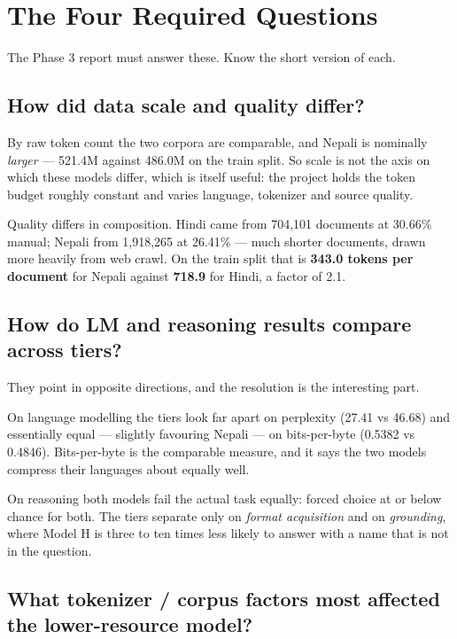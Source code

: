 \documentclass[11pt]{report}
\begin{document}
\chapter{The Four Required Questions}

The Phase 3 report must answer these. Know the short version of each.

\section{How did data scale and quality differ?}

By raw token count the two corpora are comparable, and Nepali is nominally
\emph{larger} --- 521.4M against 486.0M on the train split. So scale is not the
axis on which these models differ, which is itself useful: the project holds the
token budget roughly constant and varies language, tokenizer and source quality.

Quality differs in composition. Hindi came from 704,101 documents at 30.66\%
manual; Nepali from 1,918,265 at 26.41\% --- much shorter documents, drawn more
heavily from web crawl. On the train split that is \textbf{343.0 tokens per
document} for Nepali against \textbf{718.9} for Hindi, a factor of 2.1.

\section{How do LM and reasoning results compare across tiers?}

They point in opposite directions, and the resolution is the interesting part.

On language modelling the tiers look far apart on perplexity (27.41 vs 46.68)
and essentially equal --- slightly favouring Nepali --- on bits-per-byte
(0.5382 vs 0.4846). Bits-per-byte is the comparable measure, and it says the two
models compress their languages about equally well.

On reasoning both models fail the actual task equally: forced choice at or below
chance for both. The tiers separate only on \emph{format acquisition} and on
\emph{grounding}, where Model H is three to ten times less likely to answer with
a name that is not in the question.

\section{What tokenizer / corpus factors most affected the lower-resource model?}
\end{document}
